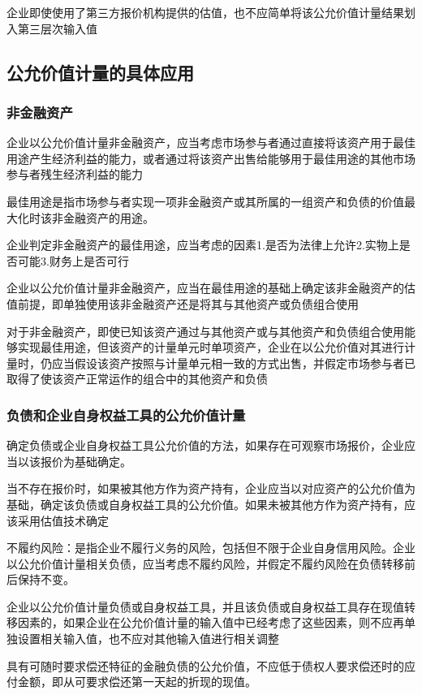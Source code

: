\documentclass[UTF8,12pt]{ctexart}
\numberwithin{equation}{section} %
\numberwithin{figure}{section}
\numberwithin{table}{section}
\begin{document}
	企业即使使用了第三方报价机构提供的估值，也不应简单将该公允价值计量结果划入第三层次输入值
	
	\subsection{公允价值计量的具体应用}
	\subsubsection{非金融资产}
	企业以公允价值计量非金融资产，应当考虑市场参与者通过直接将该资产用于最佳用途产生经济利益的能力，或者通过将该资产出售给能够用于最佳用途的其他市场参与者残生经济利益的能力
	
	最佳用途是指市场参与者实现一项非金融资产或其所属的一组资产和负债的价值最大化时该非金融资产的用途。
	
	企业判定非金融资产的最佳用途，应当考虑的因素1.是否为法律上允许2.实物上是否可能3.财务上是否可行
	
	企业以公允价值计量非金融资产，应当在最佳用途的基础上确定该非金融资产的估值前提，即单独使用该非金融资产还是将其与其他资产或负债组合使用
	
	对于非金融资产，即使已知该资产通过与其他资产或与其他资产和负债组合使用能够实现最佳用途，但该资产的计量单元时单项资产，企业在以公允价值对其进行计量时，仍应当假设该资产按照与计量单元相一致的方式出售，并假定市场参与者已取得了使该资产正常运作的组合中的其他资产和负债
	
	\subsubsection{负债和企业自身权益工具的公允价值计量}
	确定负债或企业自身权益工具公允价值的方法，如果存在可观察市场报价，企业应当以该报价为基础确定。
	
	当不存在报价时，如果被其他方作为资产持有，企业应当以对应资产的公允价值为基础，确定该负债或自身权益工具的公允价值。如果未被其他方作为资产持有，应该采用估值技术确定
	
	不履约风险：是指企业不履行义务的风险，包括但不限于企业自身信用风险。企业以公允价值计量相关负债，应当考虑不履约风险，并假定不履约风险在负债转移前后保持不变。
	
	企业以公允价值计量负债或自身权益工具，并且该负债或自身权益工具存在现值转移因素的，如果企业在公允价值计量的输入值中已经考虑了这些因素，则不应再单独设置相关输入值，也不应对其他输入值进行相关调整
	
	具有可随时要求偿还特征的金融负债的公允价值，不应低于债权人要求偿还时的应付金额，即从可要求偿还第一天起的折现的现值。
\end{document}
